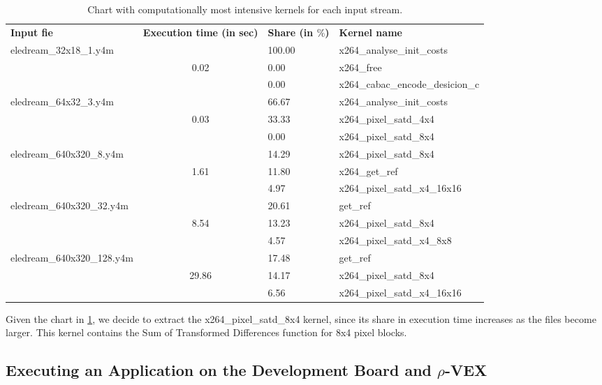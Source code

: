 \begin{table}[htb]%
\centering
	\begin{tabular}{|l|c|l|l|}
		\centering
		\bf{Input fie} & \bf{Execution time (in sec)} & \bf{Share (in $\%$)} & \bf{Kernel name} \\ \cline{1-4}
		\multirow{3}{*}{eledream\_32x18\_1.y4m}	&				& 100.00	& x264\_analyse\_init\_costs\\ 
																						&	0.02	& 0.00 		& x264\_free\\ 
																						&				& 0.00		& x264\_cabac\_encode\_desicion\_c\\ \cline{1-4}
		\multirow{3}{*}{eledream\_64x32\_3.y4m} & 			& 66.67		& x264\_analyse\_init\_costs\\
																						&	0.03	& 33.33 	& x264\_pixel\_satd\_4x4\\ 
																						&				& 0.00		& x264\_pixel\_satd\_8x4\\ \cline{1-4}
		\multirow{3}{*}{eledream\_640x320\_8.y4m}	& 			& 14.29	& x264\_pixel\_satd\_8x4\\ 
																							&	1.61	& 11.80 	& x264\_get\_ref\\ 
																							&				& 4.97		& x264\_pixel\_satd\_x4\_16x16\\ \cline{1-4}
		\multirow{3}{*}{eledream\_640x320\_32.y4m}& 			& 20.61	& get\_ref\\ 
																							& 8.54	& 13.23 	& x264\_pixel\_satd\_8x4\\ 
																							&				& 4.57		& x264\_pixel\_satd\_x4\_8x8\\ \cline{1-4}
		\multirow{3}{*}{eledream\_640x320\_128.y4m}&			& 17.48	& get\_ref\\
																							&	 29.86& 14.17 	& x264\_pixel\_satd\_8x4\\
																							&				& 6.56		& x264\_pixel\_satd\_x4\_16x16\\ \cline{1-4}
	\end{tabular}	

\caption{Chart with computationally most intensive kernels for each input stream.}
\label{tab:chart}
\end{table}

Given the chart in \ref{tab:chart}, we decide to extract the x264\_pixel\_satd\_8x4 kernel, since its share in execution time increases as the files become larger. This kernel contains the Sum of Transformed Differences function for 8x4 pixel blocks.

\subsection{Executing an Application on the Development Board and $\rho$-VEX}

